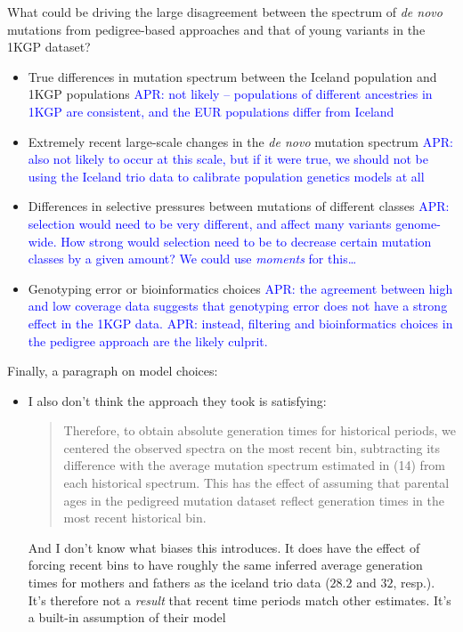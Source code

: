 \documentclass[]{article}
\newcommand{\aprcomment}[1]{{\textcolor{blue}{APR: #1}}}
\begin{document}
What could be driving the large disagreement between the spectrum of \emph{de
novo} mutations from pedigree-based approaches and that of young variants in
the 1KGP dataset?
\begin{itemize}
    \item True differences in mutation spectrum between the Iceland population
        and 1KGP populations \aprcomment{not likely -- populations of different
        ancestries in 1KGP are consistent, and the EUR populations differ from
        Iceland}
    \item Extremely recent large-scale changes in the \emph{de novo} mutation
        spectrum \aprcomment{also not likely to occur at this scale, but if it
        were true, we should not be using the Iceland trio data to calibrate
        population genetics models at all}
    \item Differences in selective pressures between mutations of different
        classes \aprcomment{selection would need to be very different, and
        affect many variants genome-wide. How strong would selection need
        to be to decrease certain mutation classes by a given amount? We could
        use \emph{moments} for this\ldots}
    \item Genotyping error or bioinformatics choices \aprcomment{the agreement
        between high and low coverage data suggests that genotyping error does
        not have a strong effect in the 1KGP data.} \aprcomment{instead, filtering
        and bioinformatics choices in the pedigree approach are the likely
    culprit.} \citep{bergeron2022mutationathon}

\end{itemize}

Finally, a paragraph on model choices:
\begin{itemize}
    \item I also don't think the approach they took is satisfying:
        \begin{quote}
            Therefore, to obtain absolute generation times for historical
            periods, we centered the observed spectra on the most recent bin,
            subtracting its difference with the average mutation spectrum
            estimated in (14) from each historical spectrum.  This has the
            effect of assuming that parental ages in the pedigreed mutation
            dataset reflect generation times in the most recent historical bin.
        \end{quote}
        And I don't know what biases this introduces. It does have the effect
        of forcing recent bins to have roughly the same inferred average
        generation times for mothers and fathers as the iceland trio data
        ($28.2$ and $32$, resp.). It's therefore not a \emph{result} that
        recent time periods match other estimates. It's a built-in assumption
        of their model
\end{itemize}
\end{document}
